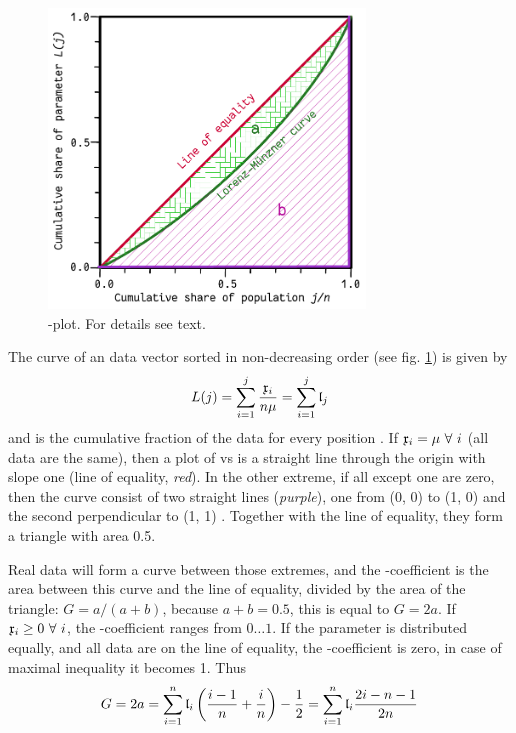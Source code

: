 \begin{refsection}
\begin{figure}
 \caption{-plot. For details see text. }
 \label{fig:Lorenz}
 \centering
 \includegraphics[width=0.75\textwidth]{Graphics/Lorenz-Munzner}
\end{figure}

The  curve of an data vector  sorted in non-decreasing order (see fig. \ref{fig:Lorenz}) is given by
\begin{equation}
  L(j) = \sum_{i=1}^j{\frac{\mathfrak{x}_i}{n\mu}} = \sum_{i=1}^j{\mathfrak{l}_j}
\end{equation}
and is the cumulative fraction of the data for every position . If \( \mathfrak{x}_i = \mu\ \forall\ i \) (all data are the same), then a plot of  vs  is a straight line through the origin with slope  one (line of equality, \emph{red}). In the other extreme, if all  except one are zero, then the  curve consist of two straight lines (\emph{purple}), one from (0, 0) to (1, 0) and the second perpendicular to (1, 1) . Together with the line of equality, they form a triangle with area \num{0.5}.

Real data will form a curve between those extremes, and the -coefficient \parencite{Gin-36} is the area between this curve and the line of equality, divided by the area of the triangle: \( G = a/(a + b) \), because \( a + b = 0.5 \), this is equal to \( G = 2a \). If \( \mathfrak{x}_i \geq 0\ \forall\ i \), the -coefficient ranges from \( 0\ldots 1 \). If the parameter is distributed equally, and all data are on the line of equality, the -coefficient is zero, in case of maximal inequality it becomes \num{1}. Thus
\begin{equation}
   G = 2 a = \sum_{i=1}^n{\mathfrak{l}_i \left( \frac{i-1}{n} + \frac{i}{n} \right)} - \frac{1}{2} = \sum_{i=1}^n{\mathfrak{l}_i \frac{2i - n - 1}{2n}}
\end{equation}


\end{refsection}
